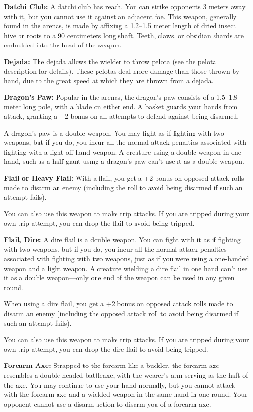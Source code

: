 \textbf{Datchi Club:} A datchi club has reach. You can strike opponents 3 meters away with it, but you cannot use it against an adjacent foe. This weapon, generally found in the arenas, is made by affixing a 1.2--1.5 meter length of dried insect hive or roots to a 90 centimeters long shaft. Teeth, claws, or obsidian shards are embedded into the head of the weapon.

\textbf{Dejada:} The dejada allows the wielder to throw pelota (see the pelota description for details). These pelotas deal more damage than those thrown by hand, due to the great speed at which they are thrown from a dejada.

\textbf{Dragon's Paw:} Popular in the arenas, the dragon's paw consists of a 1.5--1.8 meter long pole, with a blade on either end. A basket guards your hands from attack, granting a +2 bonus on all attempts to defend against being disarmed.

A dragon's paw is a double weapon. You may fight as if fighting with two weapons, but if you do, you incur all the normal attack penalties associated with fighting with a light off-hand weapon. A creature using a double weapon in one hand, such as a half-giant using a dragon's paw can't use it as a double weapon.

\textbf{Flail or Heavy Flail:} With a flail, you get a +2 bonus on opposed attack rolls made to disarm an enemy (including the roll to avoid being disarmed if such an attempt fails).

You can also use this weapon to make trip attacks. If you are tripped during your own trip attempt, you can drop the flail to avoid being tripped. 

\textbf{Flail, Dire:} A dire flail is a double weapon. You can fight with it as if fighting with two weapons, but if you do, you incur all the normal attack penalties associated with fighting with two weapons, just as if you were using a one-handed weapon and a light weapon. A creature wielding a dire flail in one hand can't use it as a double weapon---only one end of the weapon can be used in any given round.

When using a dire flail, you get a +2 bonus on opposed attack rolls made to disarm an enemy (including the opposed attack roll to avoid being disarmed if such an attempt fails).

You can also use this weapon to make trip attacks. If you are tripped during your own trip attempt, you can drop the dire flail to avoid being tripped. 

\textbf{Forearm Axe:} Strapped to the forearm like a buckler, the forearm axe resembles a double-headed battleaxe, with the wearer's arm serving as the haft of the axe. You may continue to use your hand normally, but you cannot attack with the forearm axe and a wielded weapon in the same hand in one round. Your opponent cannot use a disarm action to disarm you of a forearm axe.

